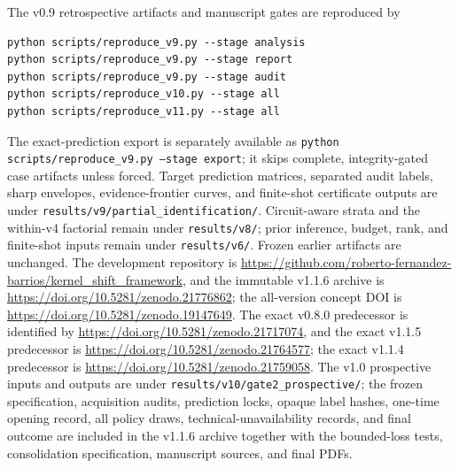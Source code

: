 \documentclass[11pt]{article}
\begin{document}
The v0.9 retrospective artifacts and manuscript gates are reproduced by
\begin{verbatim}
python scripts/reproduce_v9.py --stage analysis
python scripts/reproduce_v9.py --stage report
python scripts/reproduce_v9.py --stage audit
python scripts/reproduce_v10.py --stage all
python scripts/reproduce_v11.py --stage all
\end{verbatim}
The exact-prediction export is separately available as
\texttt{python scripts/reproduce\_v9.py --stage export}; it skips complete,
integrity-gated case artifacts unless forced. Target prediction matrices,
separated audit labels, sharp envelopes, evidence-frontier curves, and
finite-shot certificate outputs are under
\texttt{results/v9/partial\_identification/}. Circuit-aware strata and the
within-v4 factorial remain under \texttt{results/v8/}; prior inference,
budget, rank, and finite-shot inputs remain under \texttt{results/v6/}.
Frozen earlier artifacts are unchanged. The development repository is
\url{https://github.com/roberto-fernandez-barrios/kernel_shift_framework},
and the immutable v1.1.6 archive is
\url{https://doi.org/10.5281/zenodo.21776862}; the all-version concept DOI is
\url{https://doi.org/10.5281/zenodo.19147649}. The exact v0.8.0 predecessor is
identified by \url{https://doi.org/10.5281/zenodo.21717074}, and the exact
v1.1.5 predecessor is \url{https://doi.org/10.5281/zenodo.21764577}; the exact
v1.1.4 predecessor is \url{https://doi.org/10.5281/zenodo.21759058}. The v1.0
prospective inputs and outputs are under
\texttt{results/v10/gate2\_prospective/}; the frozen specification,
acquisition audits, prediction locks, opaque label hashes, one-time opening
record, all policy draws, technical-unavailability records, and final outcome
are included in the v1.1.6 archive together with the bounded-loss tests,
consolidation specification, manuscript sources, and final PDFs.
\end{document}
